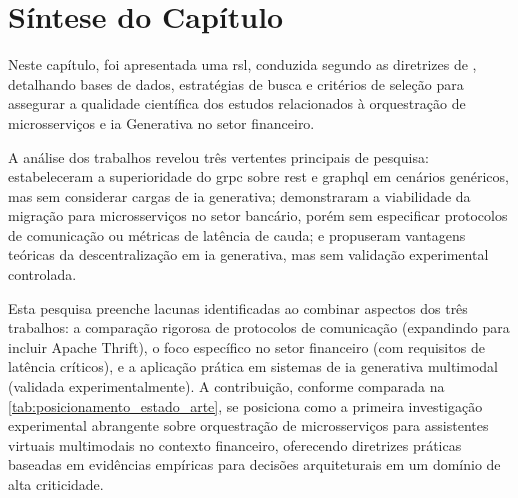 \section{Síntese do Capítulo}
\label{sec:sintese_capitulo}

Neste capítulo, foi apresentada uma \acrfull{rsl}, conduzida segundo as diretrizes de \cite{scannavino_revisao_2017}, detalhando bases de dados, estratégias de busca e critérios de seleção para assegurar a qualidade científica dos estudos relacionados à orquestração de microsserviços e \gls{ia} Generativa no setor financeiro.

A análise dos trabalhos revelou três vertentes principais de pesquisa: \textcite{niswar_performance_2024} estabeleceram a superioridade do \gls{grpc} sobre \gls{rest} e \acrshort{graphql} em cenários genéricos, mas sem considerar cargas de \gls{ia} generativa; \textcite{maulana_design_2022} demonstraram a viabilidade da migração para microsserviços no setor bancário, porém sem especificar protocolos de comunicação ou métricas de latência de cauda; e \textcite{jhingran_decentralized_2024} propuseram vantagens teóricas da descentralização em \gls{ia} generativa, mas sem validação experimental controlada.

Esta pesquisa preenche lacunas identificadas ao combinar aspectos dos três trabalhos: a comparação rigorosa de protocolos de comunicação (expandindo para incluir Apache Thrift), o foco específico no setor financeiro (com requisitos de latência críticos), e a aplicação prática em sistemas de \gls{ia} generativa multimodal (validada experimentalmente). A contribuição, conforme comparada na \autoref{tab:posicionamento_estado_arte}, se posiciona como a primeira investigação experimental abrangente sobre orquestração de microsserviços para assistentes virtuais multimodais no contexto financeiro, oferecendo diretrizes práticas baseadas em evidências empíricas para decisões arquiteturais em um domínio de alta criticidade.

